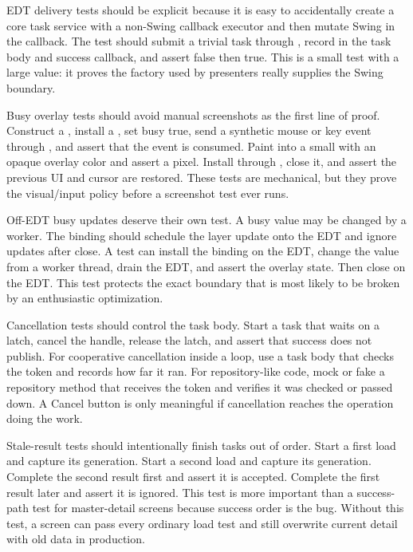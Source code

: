 EDT delivery tests should be explicit because it is easy to accidentally create
a core task service with a non-Swing callback executor and then mutate Swing in
the callback. The test should submit a trivial task through
, record
 in the task body and success
callback, and assert false then true. This is a small test with a large value:
it proves the factory used by presenters really supplies the Swing boundary.

Busy overlay tests should avoid manual screenshots as the first line of proof.
Construct a , install a , set busy true,
send a synthetic mouse or key event through , and assert
that the event is consumed. Paint into a small  with an
opaque overlay color and assert a pixel. Install through
, close it, and assert the previous UI and cursor are
restored. These tests are mechanical, but they prove the visual/input policy
before a screenshot test ever runs.

Off-EDT busy updates deserve their own test. A busy value may be changed by a
worker. The binding should schedule the layer update onto the EDT and ignore
updates after close. A test can install the binding on the EDT, change the
value from a worker thread, drain the EDT, and assert the overlay state. Then
close on the EDT. This test protects the exact boundary that is most likely to
be broken by an enthusiastic optimization.

Cancellation tests should control the task body. Start a task that waits on a
latch, cancel the handle, release the latch, and assert that success does not
publish. For cooperative cancellation inside a loop, use a task body that
checks the token and records how far it ran. For repository-like code, mock or
fake a repository method that receives the token and verifies it was checked or
passed down. A Cancel button is only meaningful if cancellation reaches the
operation doing the work.

Stale-result tests should intentionally finish tasks out of order. Start a
first load and capture its generation. Start a second load and capture its
generation. Complete the second result first and assert it is accepted. Complete
the first result later and assert it is ignored. This test is more important
than a success-path test for master-detail screens because success order is the
bug. Without this test, a screen can pass every ordinary load test and still
overwrite current detail with old data in production.

